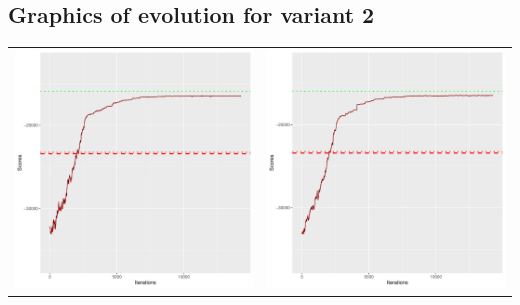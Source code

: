 \documentclass[]{scrartcl}
\begin{document}
\clearpage

\subsection{Graphics of evolution for variant 2}

\begin{table}[h!]
\begin{tabular}{cc}
\includegraphics[scale = 0.4]{./figs/win95pts/v2/25/boundsEvolution-14252.pdf} & 
\includegraphics[scale = 0.4]{./figs/win95pts/v2/50/boundsEvolution-14252.pdf} \\

\end{tabular}
\end{table}
\end{document}

